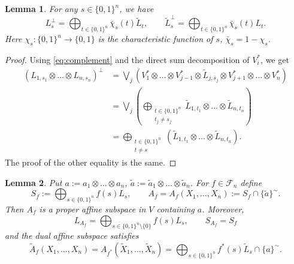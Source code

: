 \documentclass[12pt]{article}
\newtheorem{lemma}{Lemma}
\theoremstyle{definition}
\theoremstyle{remark}
\def\Fe{\mathcal F}
\begin{document}
\begin{lemma}\label{lemma:Lperp}   For any $s\in \{0,1\}^n$, we have 
\[
L_s^\perp=
\bigoplus_{t\in\{0,1\}^n} \bar{\chi}_s(t)\tilde L_t,\qquad \tilde L_s^\perp=
\bigoplus_{t\in\{0,1\}^n} \bar{\chi}_s(t)L_t.
\]
Here $\chi_s:\{0,1\}^n\to\{0,1\}$ is the characteristic function of $s$,
$\bar{\chi}_s=1-\chi_s$. 

\end{lemma}

\begin{proof} Using \eqref{eq:complement} and the direct sum decomposition of $V_i^*$, we get
\begin{align*}
\left(L_{1,s_{1}}\otimes \dots\otimes L_{n,s_{n}}\right)^\perp&= \bigvee_j\left(
V_{1}^*\otimes
\dots \otimes V_{j-1}^*\otimes \tilde L_{j,\bar s_{j}}\otimes V_{j+1}^*\otimes\dots \otimes
V_{n}^*\right)\\
&= \bigvee_j \left( \bigoplus_{\substack{t\in \{0,1\}^n\\ t_{j}\ne s_{j}}} \tilde
L_{1,t_{1}}\otimes\dots \otimes \tilde
L_{n,t_{n}}\right)\\
&= \bigoplus_{\substack{t\in \{0,1\}^n\\ t\ne s}} \left( \tilde L_{1,t_{1}}\otimes\dots \otimes \tilde
L_{n,t_{n}}\right).
\end{align*}
The proof of the other equality is the same.

\end{proof}



\begin{lemma}\label{lemma:Xf} Put $a:= a_1\otimes\dots \otimes  a_n$, $\tilde a:= \tilde
a_1\otimes\dots\otimes  \tilde a_n$.
For  $f\in \Fe_n$ define 
\[
S_f:=\bigoplus_{s\in \{0,1\}^n} f(s)L_s,\qquad A_f=A_f(X_1,\dots,X_n):=S_f\cap \{\tilde a\}^\sim.
\]
Then $A_f$ is a proper affine subspace in $V$ containing $a$. Moreover,
\[
L_{A_f}=\bigoplus_{s\in\{0,1\}^n\setminus\{0\}} f(s)L_s,\qquad S_{A_f}=S_f
\]
and the dual affine subspace satisfies  
\[
\tilde A_f(X_1,\dots,X_n)=A_{f^*}(\tilde X_1,\dots, \tilde X_n)=\bigoplus_{s\in \{0,1\}^n}
f^*(s)\tilde L_s\cap\{a\}^\sim .
\]
 


\end{lemma}
\end{document}
